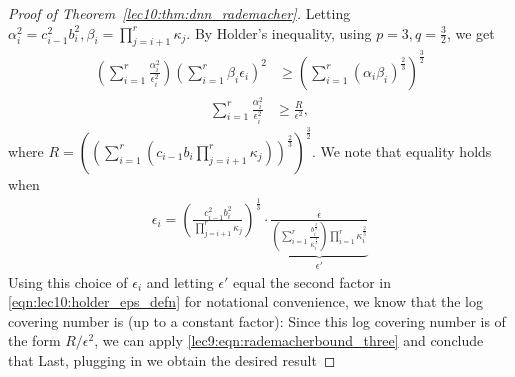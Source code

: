 \begin{proof}[Proof of Theorem~\ref{lec10:thm:dnn_rademacher}]
Letting $\alpha_i^2 = c_{i-1}^2b_i^2, \beta_i = \prod_{j=i+1}^{r}\kappa_j$. By Holder's inequality, using $p = 3, q = \frac{3}{2}$, we get
\begin{align}
    \left(\sum_{i=1}^{r}\frac{\alpha_i^2}{\epsilon_i^2}\right)\left(\sum_{i=1}^{r}\beta_i\epsilon_i\right)^2 &\geq \left(\sum_{i=1}^{r}\left(\alpha_i\beta_i\right)^{\frac{2}{3}}\right)^{\frac{3}{2}}
\end{align}
\begin{align}
    \sum_{i=1}^{r}\frac{\alpha_i^2}{\epsilon_i^2} &\geq \frac{R}{\epsilon^2},
\end{align}
where $R = \left(\left(\sum_{i=1}^{r}\left(c_{i-1}b_i\prod_{j=i+1}^{r}\kappa_j\right)\right)^{\frac{2}{3}}\right)^{\frac{3}{2}}$. We note that equality holds when 
\begin{align}
    \epsilon_i = \left(\frac{c_{i-1}^2b_i^2}{\prod_{j=i+1}^{r}\kappa_j}\right)^{\frac{1}{3}} \cdot \underbrace{\frac{\epsilon}{\left(\sum_{i=1}^{r}\frac{b_i^{\frac{2}{3}}}{\kappa_i^{\frac{2}{3}}}\right)\prod_{i=1}^{r}\kappa_i^{\frac{2}{3}} }}_{\epsilon'} \label{eqn:lec10:holder_eps_defn}
\end{align}
Using this choice of $\epsilon_i$ and letting $\epsilon'$ equal the second factor in \eqref{eqn:lec10:holder_eps_defn} for notational convenience, we know that the log covering number is (up to a constant factor):
Since this log covering number is of the form $R / \epsilon^2$, we can apply \eqref{lec9:eqn:rademacherbound_three} and conclude that
Last, plugging in
we obtain the desired result

\end{proof}

